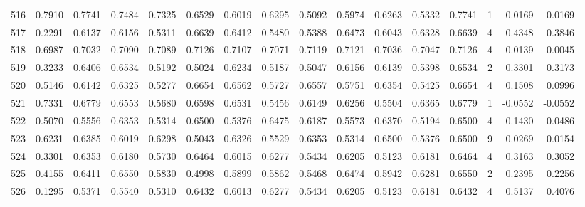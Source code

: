 \begin{tabular}{lrrrrrrrrrrrrrrr}
516 &      0.7910 &  0.7741 &  0.7484 &  0.7325 &  0.6529 &  0.6019 &  0.6295 &  0.5092 &  0.5974 &  0.6263 &   0.5332 &     0.7741 &      1 &                   -0.0169 &                    -0.0169 \\
517 &      0.2291 &  0.6137 &  0.6156 &  0.5311 &  0.6639 &  0.6412 &  0.5480 &  0.5388 &  0.6473 &  0.6043 &   0.6328 &     0.6639 &      4 &                    0.4348 &                     0.3846 \\
518 &      0.6987 &  0.7032 &  0.7090 &  0.7089 &  0.7126 &  0.7107 &  0.7071 &  0.7119 &  0.7121 &  0.7036 &   0.7047 &     0.7126 &      4 &                    0.0139 &                     0.0045 \\
519 &      0.3233 &  0.6406 &  0.6534 &  0.5192 &  0.5024 &  0.6234 &  0.5187 &  0.5047 &  0.6156 &  0.6139 &   0.5398 &     0.6534 &      2 &                    0.3301 &                     0.3173 \\
520 &      0.5146 &  0.6142 &  0.6325 &  0.5277 &  0.6654 &  0.6562 &  0.5727 &  0.6557 &  0.5751 &  0.6354 &   0.5425 &     0.6654 &      4 &                    0.1508 &                     0.0996 \\
521 &      0.7331 &  0.6779 &  0.6553 &  0.5680 &  0.6598 &  0.6531 &  0.5456 &  0.6149 &  0.6256 &  0.5504 &   0.6365 &     0.6779 &      1 &                   -0.0552 &                    -0.0552 \\
522 &      0.5070 &  0.5556 &  0.6353 &  0.5314 &  0.6500 &  0.5376 &  0.6475 &  0.6187 &  0.5573 &  0.6370 &   0.5194 &     0.6500 &      4 &                    0.1430 &                     0.0486 \\
523 &      0.6231 &  0.6385 &  0.6019 &  0.6298 &  0.5043 &  0.6326 &  0.5529 &  0.6353 &  0.5314 &  0.6500 &   0.5376 &     0.6500 &      9 &                    0.0269 &                     0.0154 \\
524 &      0.3301 &  0.6353 &  0.6180 &  0.5730 &  0.6464 &  0.6015 &  0.6277 &  0.5434 &  0.6205 &  0.5123 &   0.6181 &     0.6464 &      4 &                    0.3163 &                     0.3052 \\
525 &      0.4155 &  0.6411 &  0.6550 &  0.5830 &  0.4998 &  0.5899 &  0.5862 &  0.5468 &  0.6474 &  0.5942 &   0.6281 &     0.6550 &      2 &                    0.2395 &                     0.2256 \\
526 &      0.1295 &  0.5371 &  0.5540 &  0.5310 &  0.6432 &  0.6013 &  0.6277 &  0.5434 &  0.6205 &  0.5123 &   0.6181 &     0.6432 &      4 &                    0.5137 &                     0.4076 \\

\end{tabular}
